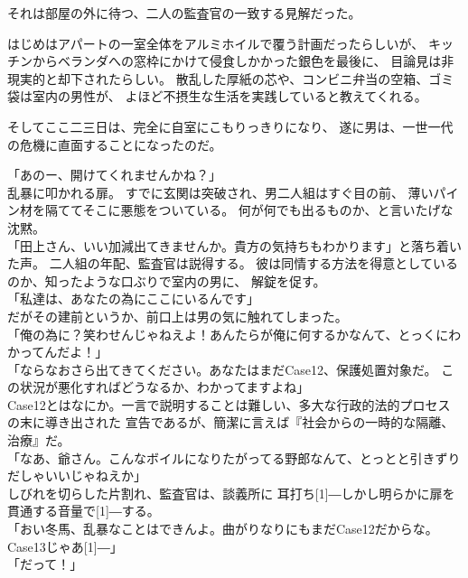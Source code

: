 \documentclass[../NenokuniMain]{subfiles}
\begin{document}
それは部屋の外に待つ、二人の監査官の一致する見解だった。

はじめはアパートの一室全体をアルミホイルで覆う計画だったらしいが、
キッチンからベランダへの窓枠にかけて侵食しかかった銀色を最後に、
目論見は非現実的と却下されたらしい。
散乱した厚紙の芯や、コンビニ弁当の空箱、ゴミ袋は室内の男性が、
よほど不摂生な生活を実践していると教えてくれる。

そしてここ二三日は、完全に自室にこもりっきりになり、
遂に男は、一世一代の危機に直面することになったのだ。

「あのー、開けてくれませんかね？」\\
乱暴に叩かれる扉。
すでに玄関は突破され、男二人組はすぐ目の前、
薄いパイン材を隔ててそこに悪態をついている。
何が何でも出るものか、と言いたげな沈黙。\\
「田上さん、いい加減出てきませんか。貴方の気持ちもわかります」と落ち着いた声。
二人組の年配、監査官は説得する。
彼は同情する方法を得意としているのか、知ったような口ぶりで室内の男に、
解錠を促す。\\
「私達は、あなたの為にここにいるんです」\\
だがその建前というか、前口上は男の気に触れてしまった。\\
「俺の為に？笑わせんじゃねえよ！あんたらが俺に何するかなんて、とっくにわかってんだよ！」\\
「ならなおさら出てきてください。あなたはまだCase12、保護処置対象だ。
この状況が悪化すればどうなるか、わかってますよね」\\
Case12とはなにか。一言で説明することは難しい、多大な行政的法的プロセスの末に導き出された
宣告であるが、簡潔に言えば『社会からの一時的な隔離、治療』だ。\\
「なあ、爺さん。こんなボイルになりたがってる野郎なんて、とっとと引きずりだしゃいいじゃねえか」\\
しびれを切らした片割れ、監査官は、談義所に
耳打ち\scalebox{2}[1]{―}しかし明らかに扉を貫通する音量で\scalebox{2}[1]{―}する。\\
「おい冬馬、乱暴なことはできんよ。曲がりなりにもまだCase12だからな。Case13じゃあ\scalebox{2}[1]{―}」\\
「だって！」

\section{}
\end{document}
